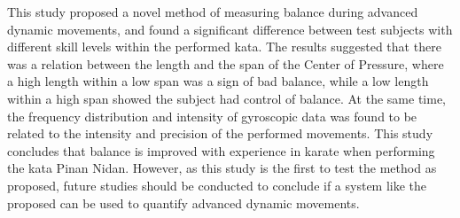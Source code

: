 



This study proposed a novel method of measuring balance during advanced dynamic movements, and found a significant difference between test subjects with different skill levels within the performed kata. The results suggested that there was a relation between the length and the span of the Center of Pressure, where a high length within a low span was a sign of bad balance, while a low length within a high span showed the subject had control of balance. At the same time, the frequency distribution and intensity of gyroscopic data was found to be related to the intensity and precision of the performed movements. This study concludes that balance is improved with experience in karate when performing the kata Pinan Nidan. However, as this study is the first to test the method as proposed, future studies should be conducted to conclude if a system like the proposed can be used to quantify advanced dynamic movements.

\vspace{2cm}